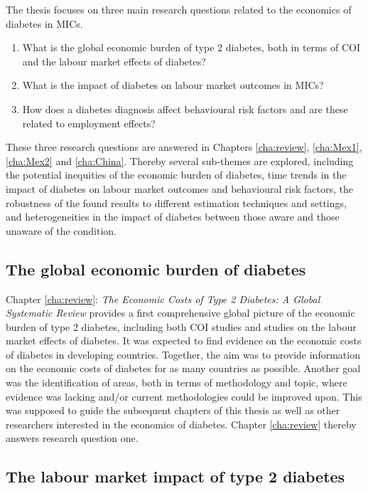 The thesis focuses on three main research questions related to the economics of diabetes in \acp{MIC}. 

\begin{enumerate}
\item What is the global economic burden of type 2 diabetes, both in terms of \ac{COI} and the labour market effects of diabetes? 

\item What is the impact of diabetes on labour market outcomes in \acp{MIC}?

\item How does a diabetes diagnosis affect behavioural risk factors and are these related to employment effects?
\end{enumerate}

These three research questions are answered in Chapters \ref{cha:review}, \ref{cha:Mex1}, \ref{cha:Mex2} and \ref{cha:China}. Thereby several sub-themes are explored, including the potential inequities of the economic burden of diabetes, time trends in the impact of diabetes on labour market outcomes and behavioural risk factors, the robustness of the found results to different estimation techniques and settings, and heterogeneities in the impact of diabetes between those aware and those unaware of the condition.


\subsection{The global economic burden of diabetes}

Chapter \ref{cha:review}: \textit{The Economic Costs of Type 2 Diabetes: A Global Systematic Review} provides a first comprehensive global picture of the economic burden of type 2 diabetes, including both \ac{COI} studies and studies on the labour market effects of diabetes. It was expected to find evidence on the economic costs of diabetes in developing countries. Together, the aim was to provide information on the economic costs of diabetes for as many countries as possible. Another goal was the identification of areas, both in terms of methodology and topic, where evidence was lacking and/or current methodologies could be improved upon. This was supposed to guide the subsequent chapters of this thesis as well as other researchers interested in the economics of diabetes. Chapter \ref{cha:review} thereby answers research question one.

\subsection{The labour market impact of type 2 diabetes}


